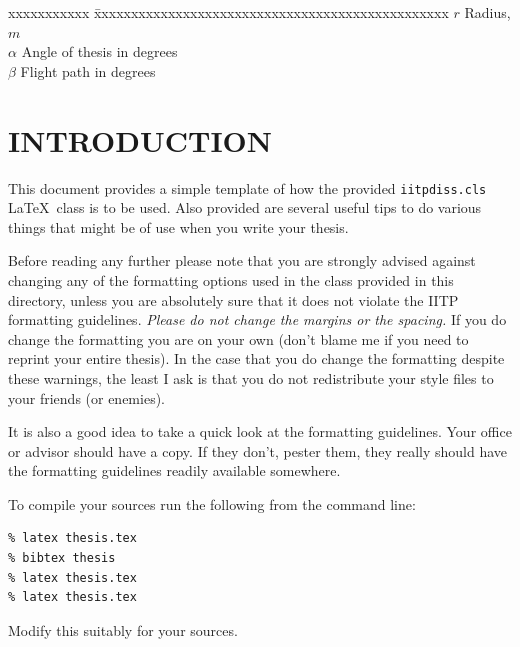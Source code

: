\documentclass[BTech]{iitpdiss}
\begin{document}
\begin{singlespace}
\begin{tabbing}
xxxxxxxxxxx \= xxxxxxxxxxxxxxxxxxxxxxxxxxxxxxxxxxxxxxxxxxxxxxxx \kill
\textbf{$r$}  \> Radius, $m$ \\
\textbf{$\alpha$}  \> Angle of thesis in degrees \\
\textbf{$\beta$}   \> Flight path in degrees \\
\end{tabbing}
\end{singlespace}

\pagebreak
\clearpage




\chapter{INTRODUCTION}
\label{chap:intro}

This document provides a simple template of how the provided
\verb+iitpdiss.cls+ \LaTeX\ class is to be used.  Also provided are
several useful tips to do various things that might be of use when you
write your thesis.

Before reading any further please note that you are strongly advised
against changing any of the formatting options used in the class
provided in this directory, unless you are absolutely sure that it
does not violate the IITP formatting guidelines.  \emph{Please do not
  change the margins or the spacing.}  If you do change the formatting
you are on your own (don't blame me if you need to reprint your entire
thesis).  In the case that you do change the formatting despite these
warnings, the least I ask is that you do not redistribute your style
files to your friends (or enemies).

It is also a good idea to take a quick look at the formatting
guidelines.  Your office or advisor should have a copy.  If they
don't, pester them, they really should have the formatting guidelines
readily available somewhere.

To compile your sources run the following from the command line:
\begin{verbatim}
% latex thesis.tex
% bibtex thesis
% latex thesis.tex
% latex thesis.tex
\end{verbatim}
Modify this suitably for your sources.
\end{document}
